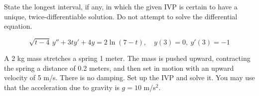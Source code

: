 \documentclass[11pt]{exam}
\begin{document}
\begin{questions}
    
    
    
\newpage \InitialsLeft
    \question[2] State the longest interval, if any, in which the given IVP is certain to have a unique, twice-differentiable solution. Do not attempt to solve the differential equation. 
    
    $$\sqrt{ t-4} \, y''+3ty'+4y=2\ln(7 - t),\quad y(3)=0,\ y'(3)=-1$$ %
    
    \vspace{2cm} 

            

    

    
    

    \question[6] A 2 kg mass stretches a spring 1 meter. The mass is pushed upward, contracting the spring a distance of 0.2 meters, and then set in motion with an upward velocity of 5 m/s. There is no damping. Set up the IVP and solve it. You may use that the acceleration due to gravity is $g = 10$ m/s$^2$. %
    

\end{questions}
\end{document}
